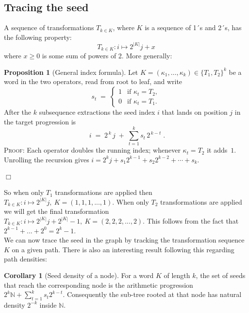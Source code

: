 \documentclass{article}
\theoremstyle{definition}
\newtheorem{proposition}{Proposition}[section]
\newtheorem{corollary}{Corollary}[section]
\begin{document}
\subsection*{Tracing the seed}
A sequence of transformations $T_{k\in K}$, where $K$ is a sequence of 1´s and 2´s, has the following property:
\begin{equation*}
    T_{k\in K}: i \longmapsto 2^{|K|}j+x
\end{equation*}
where $x\geq0$ is some sum of powers of 2. More generally:
\begin{proposition}[General index formula]\label{proposition:prop2}
Let $K=(\kappa_{1},\dots ,\kappa_{k})\in\{T_{1},T_{2}\}^{k}$ be a word in the
two operators, read from root to leaf, and write
\[
s_{t}\;=\;
  \begin{cases}
    1 &\text{if } \kappa_{t}=T_{2},\\
    0 &\text{if } \kappa_{t}=T_{1}.
  \end{cases}
\]
After the $k$ subsequence extractions the seed index $i$ that lands on
position $j$ in the target progression is
\[
\boxed{\;
  i \;=\; 2^{\,k}\,j \;+\; \sum_{t=1}^{k} s_{t}\,2^{\,k-t}\; }.
\]
\noindent
\textsc{Proof:} Each operator doubles the running index; whenever $\kappa_{t}=T_{2}$ it
adds~$1$.  Unrolling the recursion gives
\(
i = 2^{k} j
    + s_{1} 2^{k-1}
    + s_{2} 2^{k-2}
    + \cdots
    + s_{k}.
\)
\end{proposition}
\begin{flushright}
$\Box$
\end{flushright}
%
So when only $T_1$ transformations are applied then $T_{k\in K}:i\longmapsto 2^{|K|}j, \ K=(1,1,1,...,1)$. When only $T_2$ transformations are applied we will get the final transformation $T_{k\in K}:i\longmapsto 2^{|K|}j+2^{|K|}-1, \ K=(2,2,2,...,2)$. This follows from the fact that $2^{k-1}+...+2^0=2^k-1$.
%
\\[.4cm]
%
We can now trace the seed in the graph by tracking the transformation sequence $K$ on a given path. There is also an interesting result following this regarding path densities:

\begin{corollary}[Seed density of a node]
For a word $K$ of length $k$, the set of seeds that reach the
corresponding node is the arithmetic progression
$2^{k}\mathbb{N}+\sum_{t=1}^{k}s_{t}2^{k-t}$.
Consequently the sub-tree rooted at that node has natural
density $2^{-k}$ inside $\mathbb N$.
\end{corollary}
\end{document}
